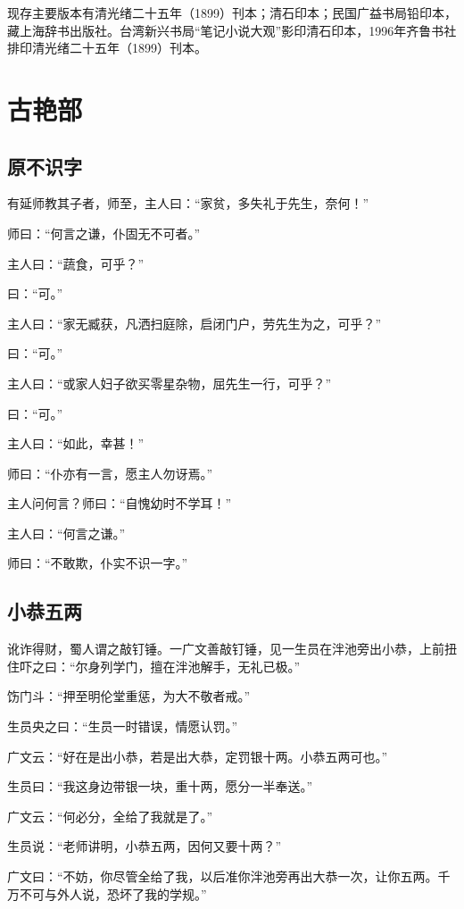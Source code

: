 \documentclass[12pt,UTF8]{ctexbook}
\begin{document}
现存主要版本有清光绪二十五年（1899）刊本；清石印本；民国广益书局铅印本，藏上海辞书出版社。台湾新兴书局“笔记小说大观”影印清石印本，1996年齐鲁书社排印清光绪二十五年（1899）刊本。

\mainmatter

\chapter{古艳部}

\section{原不识字}

有延师教其子者，师至，主人曰：“家贫，多失礼于先生，奈何！”

师曰：“何言之谦，仆固无不可者。”

主人曰：“蔬食，可乎？”

曰：“可。”

主人曰：“家无臧获，凡洒扫庭除，启闭门户，劳先生为之，可乎？”

曰：“可。”

主人曰：“或家人妇子欲买零星杂物，屈先生一行，可乎？”

曰：“可。”

主人曰：“如此，幸甚！”

师曰：“仆亦有一言，愿主人勿讶焉。”

主人问何言？师曰：“自愧幼时不学耳！”

主人曰：“何言之谦。”

师曰：“不敢欺，仆实不识一字。”

\section{小恭五两}

讹诈得财，蜀人谓之敲钉锤。一广文善敲钉锤，见一生员在泮池旁出小恭，上前扭住吓之曰：“尔身列学门，擅在泮池解手，无礼已极。”

饬门斗：“押至明伦堂重惩，为大不敬者戒。”

生员央之曰：“生员一时错误，情愿认罚。”

广文云：“好在是出小恭，若是出大恭，定罚银十两。小恭五两可也。”

生员曰：“我这身边带银一块，重十两，愿分一半奉送。”

广文云：“何必分，全给了我就是了。”

生员说：“老师讲明，小恭五两，因何又要十两？”

广文曰：“不妨，你尽管全给了我，以后准你泮池旁再出大恭一次，让你五两。千万不可与外人说，恐坏了我的学规。”
\end{document}

